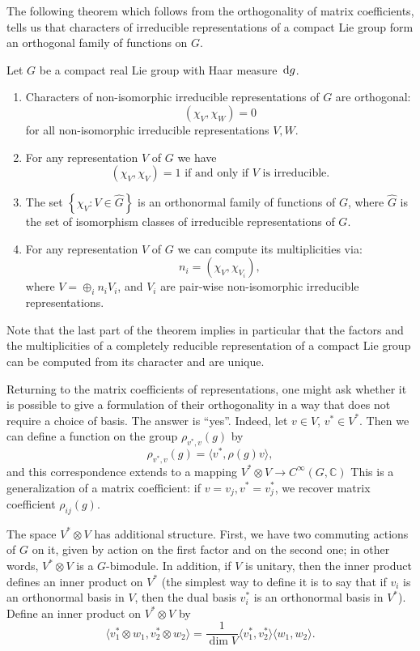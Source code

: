 \documentclass{report}
\begin{document}
The following theorem which follows from the orthogonality of matrix coefficients, tells us that characters of irreducible representations of a compact Lie group form an orthogonal family of functions on $G$.
\begin{theorem}
    Let $G$ be a compact real Lie group with Haar measure $\,\mathrm{d} g$.
    \begin{enumerate}[label = (\roman*)]
        \item Characters of non-isomorphic irreducible representations of $G$ are orthogonal:
        \[
        \left( \chi_V, \chi_W \right) = 0
        \]
        for all non-isomorphic irreducible representations $V, W$.
        \item For any representation $V$ of $G$ we have 
        \[
            \left( \chi_V, \chi_V \right) = 1 \text{ if and only if } V \text{ is irreducible}.
        \]
        \item The set $\left\{ \chi_V : V \in \hat G \right\}$ is an orthonormal family of functions of $G$, where $\hat G$ is the set of isomorphism classes of irreducible representations of $G$.
        \item For any representation $V$ of $G$ we can compute its multiplicities via:
        \[
        n_i = \left( \chi_V, \chi_{V_i} \right),
        \]
        where $V = \oplus_i n_i V_i$, and $V_i$ are pair-wise non-isomorphic irreducible representations.
    \end{enumerate}
\end{theorem}
Note that the last part of the theorem implies in particular that the factors and the multiplicities of a completely reducible representation of a compact Lie group can be computed from its character and are unique.

    
Returning to the matrix coefficients of representations, one might ask whether it is possible to give a formulation of their orthogonality in a way that does not require a choice of basis. The answer is “yes”. Indeed, let \( v \in V \), \( v^* \in V^* \). Then we can define a function on the group \( \rho_{v^*, v}(g) \) by
\[
\rho_{v^*, v}(g) = \langle v^*, \rho(g)v \rangle,
\]
and this correspondence extends to a mapping $ V^* \otimes V \rightarrow C^\infty(G, \mathbb{C})$
This is a generalization of a matrix coefficient: if \( v = v_j, v^* = v_j^* \), we recover matrix coefficient \( \rho_{ij}(g) \).

The space \( V^* \otimes V \) has additional structure. First, we have two commuting actions of \( G \) on it, given by action on the first factor and on the second one; in other words, \( V^* \otimes V \) is a \( G \)-bimodule. In addition, if \( V \) is unitary, then the inner product defines an inner product on \( V^* \) (the simplest way to define it is to say that if \( v_i \) is an orthonormal basis in \( V \), then the dual basis \( v_i^* \) is an orthonormal basis in \( V^* \)). Define an inner product on \( V^* \otimes V \) by
\begin{equation}\label{eq:inner_product_tensors}
    \langle v_1^* \otimes w_1, v_2^* \otimes w_2 \rangle = \frac{1}{\dim V} \langle v_1^*, v_2^* \rangle \langle w_1, w_2 \rangle.
\end{equation}
\end{document}
